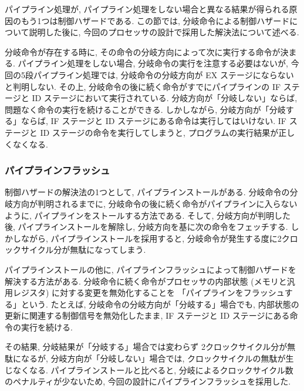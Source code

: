 \documentclass[../specifications.tex]{subfiles}
\begin{document}

  パイプライン処理が, 
  パイプライン処理をしない場合と異なる結果が得られる原因のもう1つは制御ハザードである.
  この節では, 分岐命令による制御ハザードについて説明した後に, 
  今回のプロセッサの設計で採用した解決法について述べる.

  分岐命令が存在する時に, その命令の分岐方向によって次に実行する命令が決まる.
  パイプライン処理をしない場合, 分岐命令の実行を注意する必要はないが, 
  今回の5段パイプライン処理では, 分岐命令の分岐方向が EX ステージにならないと判明しない.
  その上, 分岐命令の後に続く命令がすでにパイプラインの IF ステージと ID ステージにおいて実行されている.
  分岐方向が「分岐しない」ならば, 問題なく命令の実行を続けることができる.
  しかしながら, 分岐方向が「分岐する」ならば, IF ステージと ID ステージにある命令は実行してはいけない.
  IF ステージと ID ステージの命令を実行してしまうと, プログラムの実行結果が正しくなくなる.

  \subsubsection{パイプラインフラッシュ}
  制御ハザードの解決法の1つとして, パイプラインストールがある.
  分岐命令の分岐方向が判明されるまでに, 分岐命令の後に続く命令がパイプラインに入らないように, 
  パイプラインをストールする方法である.
  そして, 分岐方向が判明した後, パイプラインストールを解除し, 
  分岐方向を基に次の命令をフェッチする.
  しかしながら, パイプラインストールを採用すると, 
  分岐命令が発生する度に2クロックサイクル分が無駄になってしまう.

  パイプラインストールの他に, パイプラインフラッシュによって制御ハザードを解決する方法がある.
  分岐命令に続く命令がプロセッサの内部状態 (メモリと汎用レジスタ) に対する変更を無効化することを
  「パイプラインをフラッシュする」という.
  たとえば, 分岐命令の分岐方向が「分岐する」場合でも, 
  内部状態の更新に関連する制御信号を無効化したまま, 
  IF ステージと ID ステージにある命令の実行を続ける.

  その結果, 分岐結果が「分岐する」場合では変わらず 2クロックサイクル分が無駄になるが, 
  分岐方向が「分岐しない」場合では, クロックサイクルの無駄が生じなくなる.
  パイプラインストールと比べると, 分岐によるクロックサイクル数のペナルティが少ないため, 
  今回の設計にパイプラインフラッシュを採用した.
\end{document}
